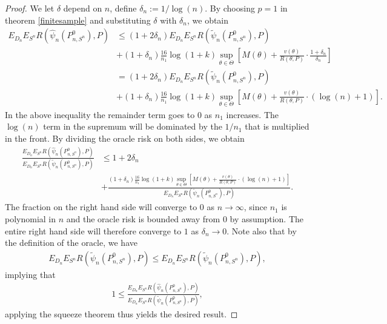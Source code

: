 \documentclass[11pt, a4paper]{article}
\theoremstyle{definition}
\theoremstyle{remark}
\newcommand{\btheta}{\theta}
\newcommand{\la}{\psi}
\newcommand{\Sn}{S^n}
\begin{document}
\begin{proof}
    We let $ \delta $ depend on $ n $, define $ \delta_n := 1/\log(n) $.  By choosing $ p = 1 $ in theorem \ref{finitesample} and substituting $ \delta $ with $ \delta_n $, we obtain
    \begin{align*}
        E_{D_n} E_{\Sn} R(\hat{\la}_n(P_{n, \Sn}^{0}), P) &\leq(1 + 2 \delta_n) E_{D_n} E_{\Sn} R(\tilde{\la}_n(P_{n,\Sn}^{0}), P)\\
                                                        &+(1 + \delta_n) \frac{16}{n_1} \log (1 +k) \sup_{\btheta \in \Theta} \left[ M(\theta) + \frac{v(\theta)}{R(\theta, P)} \cdot \frac{1 + \delta_n}{\delta_n}  \right]\\
                                                        &= (1 + 2 \delta_n) E_{D_n} E_{\Sn} R(\tilde{\la}_n(P_{n,\Sn}^{0}), P)\\
                                                        &+(1 + \delta_n) \frac{16}{n_1} \log (1 +k) \sup_{\btheta \in \Theta} \left[ M(\theta) + \frac{v(\theta)}{R(\theta, P)} \cdot (\log(n) + 1) \right].
    \end{align*}
    In the above inequality the remainder term goes to $ 0 $ as $ n_1 $ increases. The $ \log(n) $ term in the supremum will be dominated by the $ 1/n_1 $ that is multiplied in the front. By dividing the oracle risk on both sides, we obtain
    \begin{align*}
        \frac{E_{D_n} E_{\Sn} R(\hat{\la}_n(P_{n, \Sn}^{0}), P)}{E_{D_n} E_{\Sn} R(\tilde{\la}_n(P_{n,\Sn}^{0}), P)} 
        &\leq 1 + 2 \delta_n\\
        &+\frac{(1 + \delta_n)\frac{16}{n_1} \log (1 +k) \sup_{\btheta \in \Theta} \left[ M(\theta) + \frac{v(\theta)}{R(\theta , P)} \cdot (\log(n) + 1) \right]}{E_{D_n} E_{\Sn} R( \tilde{\la}_n(P_{n,\Sn}^{0}), P)}.
    \end{align*}
    The fraction on the right hand side will converge to $ 0 $ as $ n \to \infty $, since $ n_1 $ is polynomial in $ n $ and the oracle risk is bounded away from $ 0 $ by assumption. The entire right hand side will therefore converge to $ 1 $ as $ \delta_n \to 0 $. Note also that by the definition of the oracle, we have 
    \begin{align*}
        E_{D_n} E_{\Sn} R(\tilde{\la}_n(P_{n,\Sn}^{0}), P) \leq E_{D_n} E_{\Sn} R(\tilde{\la}_n(P_{n,\Sn}^{0}), P),
    \end{align*}
    implying that 
        \begin{align*}
            1 \leq \frac{E_{D_n} E_{\Sn} R(\hat{\la}_n(P_{n, \Sn}^{0}), P)}{E_{D_n} E_{\Sn} R(\tilde{\la}_n(P_{n,\Sn}^{0}), P)}, 
    \end{align*}
    applying the squeeze theorem thus yields the desired result.         
\end{proof}
\end{document}
